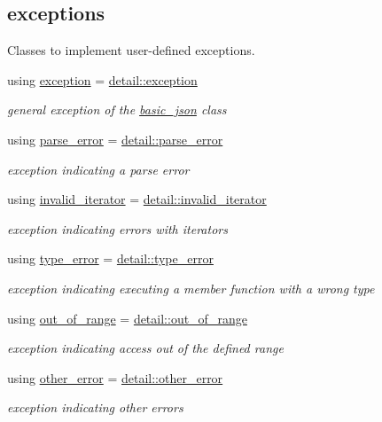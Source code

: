 \subsection*{exceptions}
\label{_amgrp19ad27801b95bd1f2c6c2bf83dbb7515}%
Classes to implement user-\/defined exceptions. \begin{DoxyCompactItemize}
\item 
using \hyperlink{classnlohmann_1_1basic__json_a9a0aced019cb1d65bb49703406c84970}{exception} = \hyperlink{classnlohmann_1_1detail_1_1exception}{detail\+::exception}
\begin{DoxyCompactList}\small\item\em general exception of the \hyperlink{classnlohmann_1_1basic__json}{basic\+\_\+json} class \end{DoxyCompactList}\item 
using \hyperlink{classnlohmann_1_1basic__json_af1efc2468e6022be6e35fc2944cabe4d}{parse\+\_\+error} = \hyperlink{classnlohmann_1_1detail_1_1parse__error}{detail\+::parse\+\_\+error}
\begin{DoxyCompactList}\small\item\em exception indicating a parse error \end{DoxyCompactList}\item 
using \hyperlink{classnlohmann_1_1basic__json_ac13d32f7cbd02d616e71d8dc30dadcbf}{invalid\+\_\+iterator} = \hyperlink{classnlohmann_1_1detail_1_1invalid__iterator}{detail\+::invalid\+\_\+iterator}
\begin{DoxyCompactList}\small\item\em exception indicating errors with iterators \end{DoxyCompactList}\item 
using \hyperlink{classnlohmann_1_1basic__json_a4010e8e268fefd86da773c10318f2902}{type\+\_\+error} = \hyperlink{classnlohmann_1_1detail_1_1type__error}{detail\+::type\+\_\+error}
\begin{DoxyCompactList}\small\item\em exception indicating executing a member function with a wrong type \end{DoxyCompactList}\item 
using \hyperlink{classnlohmann_1_1basic__json_a28f7c2f087274a0012eb7a2333ee1580}{out\+\_\+of\+\_\+range} = \hyperlink{classnlohmann_1_1detail_1_1out__of__range}{detail\+::out\+\_\+of\+\_\+range}
\begin{DoxyCompactList}\small\item\em exception indicating access out of the defined range \end{DoxyCompactList}\item 
using \hyperlink{classnlohmann_1_1basic__json_a3333a5a8714912adda33a35b369f7b3d}{other\+\_\+error} = \hyperlink{classnlohmann_1_1detail_1_1other__error}{detail\+::other\+\_\+error}
\begin{DoxyCompactList}\small\item\em exception indicating other errors \end{DoxyCompactList}\end{DoxyCompactItemize}
